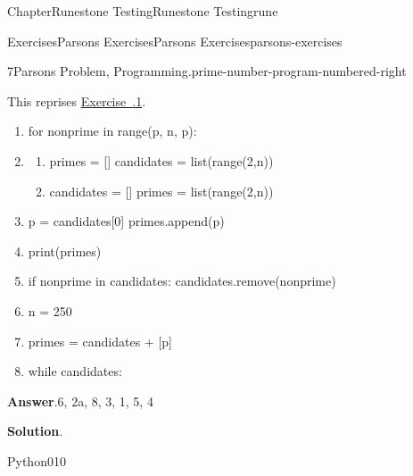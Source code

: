 \documentclass[oneside,10pt,]{book}
\newcommand{\blocktitlefont}{\relax}
\newcommand{\xreffont}{\relax}
\numberwithin{equation}{section}
\begin{document}
\begin{chapterptx}{Chapter}{Runestone Testing}{}{Runestone Testing}{}{}{rune}
\begin{exercises-section}{Exercises}{Parsons Exercises}{}{Parsons Exercises}{}{}{parsons-exercises}
\begin{divisionexercise}{7}{Parsons Problem, Programming.}{}{prime-number-program-numbered-right}
\par
This reprises \hyperlink{sieve-primes}{Exercise~{\xreffont 2.5.1}}.%
\par
%
\begin{enumerate}[label={\arabic*.}]
\item{}%
\begin{codedisplayleft}
for nonprime in range(p, n, p):
\end{codedisplayleft}
%
\item{}%
\begin{enumerate}[label={(\alph*)}]
\item{}%
\begin{codedisplay}
primes = []
candidates = list(range(2,n))
\end{codedisplay}
%
\item{}%
\begin{codedisplay}
candidates = []
primes = list(range(2,n))
\end{codedisplay}
%
\end{enumerate}
%
\item{}%
\begin{codedisplayleft}
p = candidates[0]
primes.append(p)
\end{codedisplayleft}
%
\item{}%
\begin{codedisplayleft}
print(primes)
\end{codedisplayleft}
%
\item{}%
\begin{codedisplayleft}
if nonprime in candidates:
    candidates.remove(nonprime)
\end{codedisplayleft}
%
\item{}%
\begin{codedisplayleft}
n = 250
\end{codedisplayleft}
%
\item{}%
\begin{codedisplayleft}
primes = candidates + [p]
\end{codedisplayleft}
%
\item{}%
\begin{codedisplayleft}
while candidates:
\end{codedisplayleft}
%
\end{enumerate}
%
\par\smallskip%
\noindent\textbf{\blocktitlefont Answer}.\hypertarget{prime-number-program-numbered-right-5}{}\quad{}6, 2a, 8, 3, 1, 5, 4%
\par\smallskip%
\noindent\textbf{\blocktitlefont Solution}.\hypertarget{prime-number-program-numbered-right-6}{}\quad{}\begin{program}{Python}{0}{1}{0}

\end{program}
\end{divisionexercise}
\end{exercises-section}
\end{chapterptx}
\end{document}
